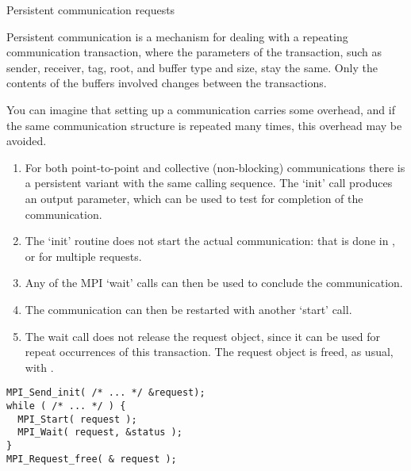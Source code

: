 
 {Persistent communication requests}
\label{sec:persistent}

Persistent communication is a mechanism for dealing
with a repeating communication transaction,
where the parameters of the transaction,
such as sender, receiver, tag, root, and buffer type and size,
stay the same.
Only the contents of the buffers involved changes between the transactions.

You can imagine that setting up a communication
carries some overhead, and if the same communication structure
is repeated many times, this overhead may be avoided.

\begin{enumerate}
\item
  For both point-to-point and collective (non-blocking) communications
  there is a persistent variant 
  with the same calling sequence.
  The `init' call produces
  an  output parameter,
  which can be used to test for completion of the communication.
\item 
  The `init' routine does not start the actual communication:
  that is done in
  ,
  or  for multiple requests.
\item Any of the MPI `wait' calls can then be used
  to conclude the communication.
\item The communication can then be restarted with another `start' call.
\item The wait call does not release the request object,
  since it can be used for repeat occurrences of this transaction.
  The request object is freed, as usual, with .
\end{enumerate}

\begin{lstlisting}
MPI_Send_init( /* ... */ &request);
while ( /* ... */ ) {
  MPI_Start( request );
  MPI_Wait( request, &status );
}
MPI_Request_free( & request );
\end{lstlisting}


